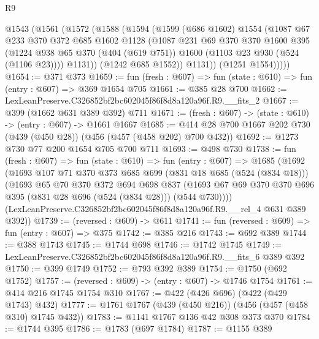 \begin{lexlean}{R9}
\begin{coremodule}
      @1543
        (@1561
          (@1572
            (@1588
              (@1594
                (@1599
                  (@686 @1602)
                  @1554
                  (@1087
                    @67
                    @233
                    @370
                    @372
                    @685
                    @1602
                    @1128
                    (@1087
                      @231
                      @69
                      @370
                      @370
                      @1600
                      @395
                      (@1224
                        @938
                        @65
                        @370
                        (@404 (@619 @751))
                        @1600
                        (@1103 @23 @930 (@524 (@1106 @23))))
                      @1131))
                  (@1242 @685 @1552))
                @1131))
            (@1251 @1554)))))
@1654 := @371 @373
@1659 := fun (fresh : @607) => fun (state : @610) => fun (entry : @607) => @369 @1654 @705
@1661 := @385 @28 @700
@1662 := LexLeanPreserve.C326852bf2bc602045f86f8d8a120a96f.R9.__fits_2
@1667 := @399 (@1662 @631 @389 @392) @711
@1671 := (fresh : @607) -> (state : @610) -> (entry : @607) -> @1661 @1667
@1685 := @414 @28 @700 @1667 @202 @730 (@439 (@450 @28)) (@456 (@457 (@458 @202) @700 @432))
@1692 := @1273 @730 @77 @200 @1654 @705 @700 @711
@1693 := @498 @730
@1738 := fun (fresh : @607) =>
  fun (state : @610) =>
  fun (entry : @607) =>
  @1685
    (@1692
      (@1693
        @107
        @71
        @370
        @373
        @685
        @699
        (@831 @18 @685 (@524 (@834 @18)))
        (@1693
          @65
          @70
          @370
          @372
          @694
          @698
          @837
          (@1693 @67 @69 @370 @370 @696 @395 (@831 @28 @696 (@524 (@834 @28))) (@544 @730))))
      (LexLeanPreserve.C326852bf2bc602045f86f8d8a120a96f.R9.__rel_4 @631 @389 @392))
@1739 := (reversed : @609) -> @611
@1741 := fun (reversed : @609) => fun (entry : @607) => @375
@1742 := @385 @216
@1743 := @692 @389
@1744 := @388 @1743
@1745 := @1744 @698
@1746 := @1742 @1745
@1749 := LexLeanPreserve.C326852bf2bc602045f86f8d8a120a96f.R9.__fits_6 @389 @392
@1750 := @399 @1749
@1752 := @793 @392 @389
@1754 := @1750 (@692 @1752)
@1757 := (reversed : @609) -> (entry : @607) -> @1746 @1754
@1761 := @414 @216 @1745 @1754 @310
@1767 := @422 (@426 @696) (@422 (@429 @1743) @432)
@1777 := @1761 @1767 (@439 (@450 @216)) (@456 (@457 (@458 @310) @1745 @432))
@1783 := @1141 @1767 @136 @42 @308 @373 @370
@1784 := @1744 @395
@1786 := @1783 (@697 @1784)
@1787 := @1155 @389

\end{coremodule}
\end{lexlean}
